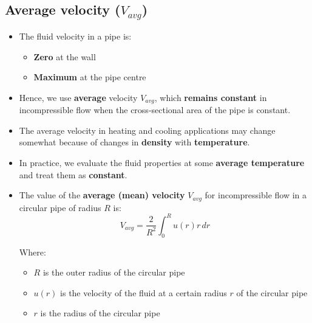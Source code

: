 \documentclass[11pt]{article}
\begin{document}
\subsection{Average velocity (\(V_{avg}\))}
\label{sec:org6901e0b}
\begin{itemize}
\item The fluid velocity in a pipe is:
\begin{itemize}
\item \textbf{Zero} at the wall
\item \textbf{Maximum} at the pipe centre
\end{itemize}
\item Hence, we use \textbf{average} velocity \(V_{avg}\), which \textbf{remains constant} in incompressible flow when the cross-sectional area of the pipe is constant.
\item The average velocity in heating and cooling applications may change somewhat because of changes in \textbf{density} with \textbf{temperature}.
\item In practice, we evaluate the fluid properties at some \textbf{average temperature} and treat them as \textbf{constant}.
\item The value of the \textbf{average (mean) velocity} \(V_{avg}\) for incompressible flow in a circular pipe of radius \(R\) is:
\[V_{avg} = \frac{2}{R^2} \int_0^R u(r) r \, dr\]

Where:
\begin{itemize}
\item \(R\) is the outer radius of the circular pipe
\item \(u(r)\) is the velocity of the fluid at a certain radius \(r\) of the circular pipe
\item \(r\) is the radius of the circular pipe
\end{itemize}
\end{itemize}
\end{document}
